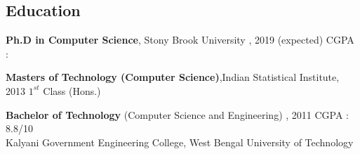 \documentclass{res}
\begin{document}
\begin{resume}

\vspace{-0.1in}
\section{Education}  
        
{\bf Ph.D in Computer Science}, Stony Brook University , 2019 (expected)  \hfill  CGPA :  ~~~
 
 \vspace{-0.1in}
 {\bf Masters of Technology (Computer Science)},Indian Statistical Institute,  2013  \hfill   $1^{st}$ Class (Hons.)  ~~

\vspace{-0.1in}
 {\bf Bachelor of Technology} (Computer Science and Engineering) ,   2011  \hfill  CGPA : 8.8/10\\
 Kalyani Government Engineering College,  West Bengal University of Technology  \\

 
 

\end{resume}
\end{document}
